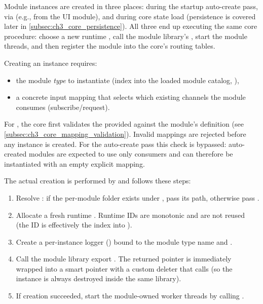 Module instances are created in three places: during the startup auto-create pass, via  (e.g., from the UI module), and during core state load (persistence is covered later in \autoref{subsec:ch3_core_persistence}).
All three end up executing the same core procedure: choose a new runtime , call the module library's , start the module threads, and then register the module into the core's routing tables.

Creating an instance requires:
\begin{itemize}
    \item the module \emph{type} to instantiate (index into the loaded module catalog, ),
    \item a concrete input mapping  that selects which existing channels the module consumes (subscribe/request).
\end{itemize}

For , the core first validates the provided  against the module's  definition (see \autoref{subsec:ch3_core_mapping_validation}).
Invalid mappings are rejected before any instance is created.
For the auto-create pass this check is bypassed: auto-created modules are expected to use only  consumers and can therefore be instantiated with an empty explicit mapping.

The actual creation is performed by  and follows these steps:
\begin{enumerate}
    \item Resolve : if the per-module folder exists under , pass its path, otherwise pass .
    \item Allocate a fresh runtime . Runtime IDs are monotonic and are not reused (the ID is effectively the index into ).
    \item Create a per-instance logger () bound to the module type name and .
    \item Call the module library export .
    The returned pointer is immediately wrapped into a smart pointer with a custom deleter that calls  (so the instance is always destroyed inside the same library).
    \item If creation succeeded, start the module-owned worker threads by calling .
\end{enumerate}

